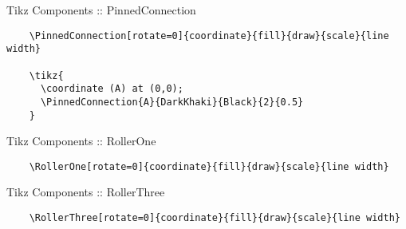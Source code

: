 \documentclass[9pt,xcolor={svgnames, x11names}]{beamer}
\begin{document}

\begin{frame}[fragile]{Tikz Components :: PinnedConnection}

  \small
  \begin{verbatim}
    \PinnedConnection[rotate=0]{coordinate}{fill}{draw}{scale}{line width}

    \tikz{
      \coordinate (A) at (0,0);
      \PinnedConnection{A}{DarkKhaki}{Black}{2}{0.5}
    }
  \end{verbatim}

  \vspace{1cm}


\end{frame}

\begin{frame}[fragile]{Tikz Components :: RollerOne}

  \footnotesize
  \begin{verbatim}
    \RollerOne[rotate=0]{coordinate}{fill}{draw}{scale}{line width}
  \end{verbatim}

  \vspace{1cm}


\end{frame}

\begin{frame}[fragile]{Tikz Components :: RollerThree}

  \footnotesize
  \begin{verbatim}
    \RollerThree[rotate=0]{coordinate}{fill}{draw}{scale}{line width}
  \end{verbatim}

  \vspace{1cm}


\end{frame}
\end{document}
